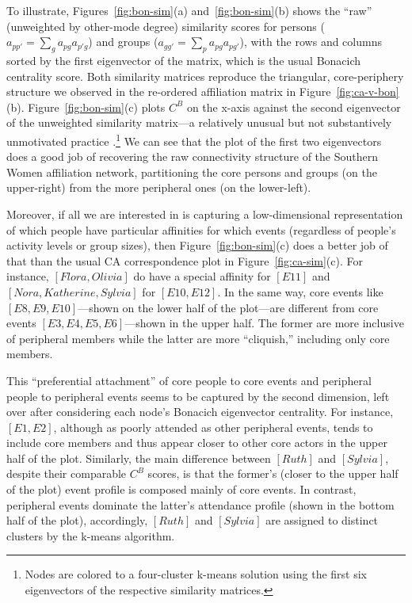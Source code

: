 \documentclass[a4paper,fleqn]{cas-sc}
\begin{document}
To illustrate, Figures~\ref{fig:bon-sim}(a) and~\ref{fig:bon-sim}(b) shows the ``raw'' (unweighted by other-mode degree) similarity scores for persons ($a_{pp'} = \sum_g a_{pg}a_{p'g}$) and groups ($a_{gg'} = \sum_p a_{pg}a_{pg'}$), with the rows and columns sorted by the first eigenvector of the matrix, which is the usual Bonacich centrality score. Both similarity matrices reproduce the triangular, core-periphery structure we observed in the re-ordered affiliation matrix in Figure~\ref{fig:ca-v-bon}(b).  Figure~\ref{fig:bon-sim}(c) plots $C^B$ on the x-axis against the second eigenvector of the unweighted similarity matrix---a relatively unusual but not substantively unmotivated practice \citep{iacobucci2017eigenvector}.\footnote{Nodes are colored to a four-cluster k-means solution using the first six eigenvectors of the respective similarity matrices.}  We can see that the plot of the first two eigenvectors does a good job of recovering the raw connectivity structure of the Southern Women affiliation network, partitioning the core persons and groups (on the upper-right) from the more peripheral ones (on the lower-left). 

Moreover, if all we are interested in is capturing a low-dimensional representation of which people have particular affinities for which events (regardless of people's activity levels or group sizes), then Figure~\ref{fig:bon-sim}(c) does a better job of that than the usual CA correspondence plot in Figure~\ref{fig:ca-sim}(c). For instance, $\left[Flora, Olivia\right]$ do have a special affinity for $\left[E11\right]$ and $\left[Nora, Katherine, Sylvia\right]$ for $\left[E10, E12\right]$. In the same way, core events like $\left[E8, E9, E10\right]$---shown on the lower half of the plot---are different from core events $\left[E3, E4, E5, E6\right]$---shown in the upper half. The former are more inclusive of peripheral members while the latter are more ``cliquish,'' including only core members. 

This ``preferential attachment'' \citep{barabasi1999emergence} of core people to core events and peripheral people to peripheral events seems to be captured by the second dimension, left over after considering each node's Bonacich eigenvector centrality. For instance, $\left[E1, E2\right]$, although as poorly attended as other peripheral events, tends to include core members and thus appear closer to other core actors in the upper half of the plot. Similarly, the main difference between $\left[Ruth\right]$ and $\left[Sylvia\right]$, despite their comparable $C^B$ scores, is that the former's (closer to the upper half of the plot) event profile is composed mainly of core events. In contrast, peripheral events dominate the latter's attendance profile (shown in the bottom half of the plot), accordingly, $\left[Ruth\right]$ and $\left[Sylvia\right]$ are assigned to distinct clusters by the k-means algorithm. 
\end{document}
